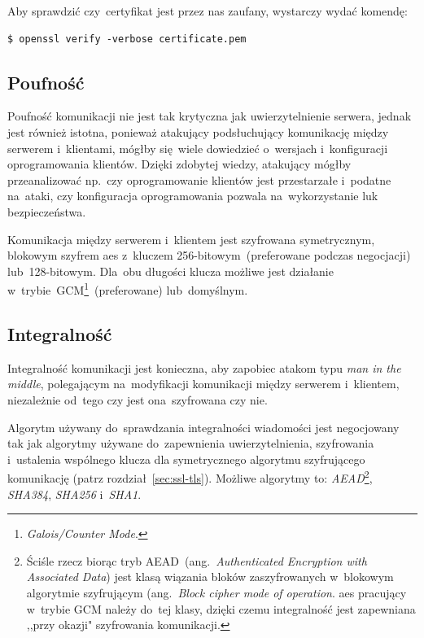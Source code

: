 \documentclass[thesis]{subfiles}
\begin{document}
Aby sprawdzić czy~certyfikat jest przez nas zaufany, wystarczy wydać komendę:
\begin{lstlisting}[numbers=none]
$ openssl verify -verbose certificate.pem
\end{lstlisting}


\subsection{Poufność}

Poufność komunikacji nie jest tak krytyczna jak uwierzytelnienie serwera, jednak jest również istotna, ponieważ atakujący podsłuchujący komunikację między serwerem i~klientami, mógłby się~wiele dowiedzieć o~wersjach i~konfiguracji oprogramowania klientów. Dzięki zdobytej wiedzy, atakujący mógłby przeanalizować np.~czy oprogramowanie klientów jest przestarzałe i~podatne na~ataki, czy konfiguracja oprogramowania pozwala na~wykorzystanie luk bezpieczeństwa.

Komunikacja między serwerem i~klientem jest szyfrowana symetrycznym, blokowym szyfrem \gls{aes} z~kluczem 256-bitowym~(preferowane podczas negocjacji) lub~128-bitowym. Dla~obu długości klucza możliwe jest działanie w~trybie~GCM\footnote{\emph{Galois/Counter Mode}.}~(preferowane) lub~domyślnym.


\subsection{Integralność}

Integralność komunikacji jest konieczna, aby zapobiec atakom typu \emph{man in the middle}, polegającym na~modyfikacji komunikacji między serwerem i~klientem, niezależnie od~tego czy jest ona~szyfrowana czy nie.

Algorytm używany do~sprawdzania integralności wiadomości jest negocjowany tak jak algorytmy używane do~zapewnienia uwierzytelnienia, szyfrowania i~ustalenia wspólnego klucza dla symetrycznego algorytmu szyfrującego komunikację (patrz rozdział~\ref{sec:ssl-tls}). Możliwe algorytmy to: \emph{AEAD}\footnote{Ściśle rzecz biorąc tryb AEAD~(ang.~\emph{Authenticated Encryption with Associated Data}) jest klasą wiązania bloków zaszyfrowanych w~blokowym algorytmie szyfrującym (ang.~\emph{Block cipher mode of operation}. \gls{aes} pracujący w~trybie GCM należy do~tej klasy, dzięki czemu integralność jest zapewniana ,,przy okazji" szyfrowania komunikacji.}, \emph{SHA384}, \emph{SHA256} i~\emph{SHA1}.
\end{document}
